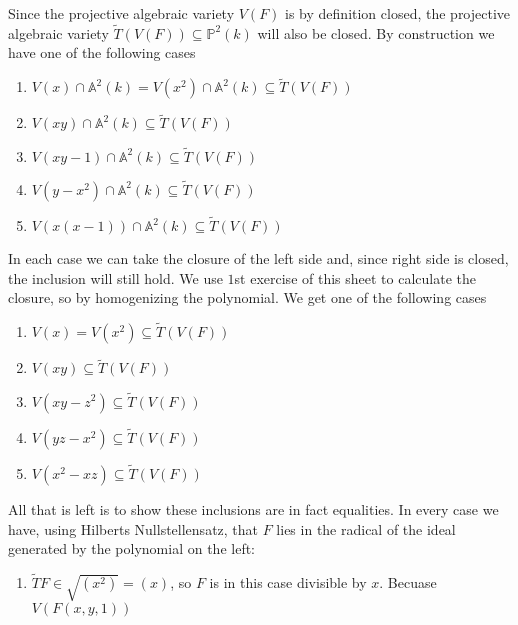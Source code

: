\begin{exercise}{2}
\begin{enumerate}
            Since the projective algebraic variety $V(F)$ is by definition
            closed, the projective algebraic variety $\widetilde{T}(V(F))
            \subseteq \mathbb{P}^2(k)$ will also be closed. By construction we
            have one of the following cases
            \begin{enumerate}
                \item{} $V(x) \cap \mathbb{A}^2(k) = V(x^2) \cap \mathbb{A}^2(k)
                    \subseteq \widetilde{T}(V(F))$
                \item{} $V(xy) \cap \mathbb{A}^2(k) \subseteq
                    \widetilde{T}(V(F))$
                \item{} $V(xy - 1) \cap \mathbb{A}^2(k) \subseteq
                    \widetilde{T}(V(F))$
                \item{} $V(y - x^2) \cap \mathbb{A}^2(k) \subseteq
                    \widetilde{T}(V(F))$
                \item{} $V(x(x - 1)) \cap \mathbb{A}^2(k) \subseteq
                    \widetilde{T}(V(F))$
            \end{enumerate}
            In each case we can take the closure of the left side and, since
            right side is closed, the inclusion will still hold. We use $1$st
            exercise of this sheet to calculate the closure, so by homogenizing
            the polynomial. We get one of the following cases
            \begin{enumerate}
                \item{} $V(x) = V(x^2) \subseteq \widetilde{T}(V(F))$
                \item{} $V(xy) \subseteq \widetilde{T}(V(F))$
                \item{} $V(xy - z^2) \subseteq \widetilde{T}(V(F))$
                \item{} $V(yz - x^2) \subseteq \widetilde{T}(V(F))$
                \item{} $V(x^2 - xz) \subseteq \widetilde{T}(V(F))$
            \end{enumerate}
            All that is left is to show these inclusions are in fact equalities.
            In every case we have, using Hilberts Nullstellensatz, that $F$
            lies in the radical of the ideal generated by the polynomial on the
            left:
            \begin{enumerate}
                \item{} $\widetilde{T}F \in \sqrt{(x^2)} = (x)$, so $F$ is in
                    this case divisible by $x$. Becuase $V(F(x, y, 1))$

\end{enumerate}
\end{enumerate}
\end{exercise}
